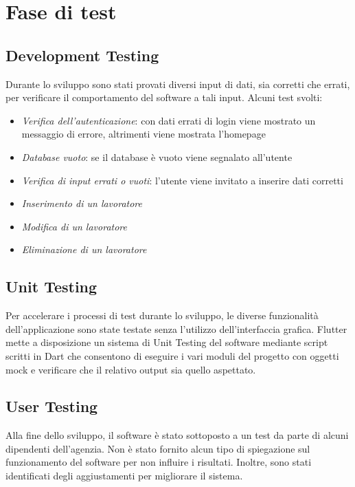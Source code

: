 \documentclass[a4paper, oneside, 12pt]{article}
\begin{document}
\section{Fase di test}

\subsection{Development Testing}
Durante lo sviluppo sono stati provati diversi input di dati, sia corretti che errati, per
verificare il comportamento del software a tali input.
Alcuni test svolti:
\begin{itemize}
	\item \textit{Verifica dell'autenticazione}: con dati errati di login viene mostrato un messaggio di errore, altrimenti viene mostrata l'homepage
	\item \textit{Database vuoto}: se il database è vuoto viene segnalato all'utente
	\item \textit{Verifica di input errati o vuoti}: l'utente viene invitato a inserire dati corretti
	\item \textit{Inserimento di un lavoratore}
	\item \textit{Modifica di un lavoratore}
	\item \textit{Eliminazione di un lavoratore}
\end{itemize}

\subsection{Unit Testing}

Per accelerare i processi di test durante lo sviluppo, le diverse funzionalità dell'applicazione 
sono state testate senza l'utilizzo dell'interfaccia grafica. Flutter mette a disposizione un sistema 
di Unit Testing del software mediante script scritti in Dart che consentono di eseguire i vari moduli del progetto
con oggetti mock e verificare che il relativo output sia quello aspettato.


\subsection{User Testing}
Alla fine dello sviluppo, il software è stato sottoposto a un test da parte di alcuni dipendenti dell'agenzia.
Non è stato fornito alcun tipo di spiegazione sul funzionamento del software per non influire i risultati.
Inoltre, sono stati identificati degli aggiustamenti per migliorare il sistema.
\end{document}
